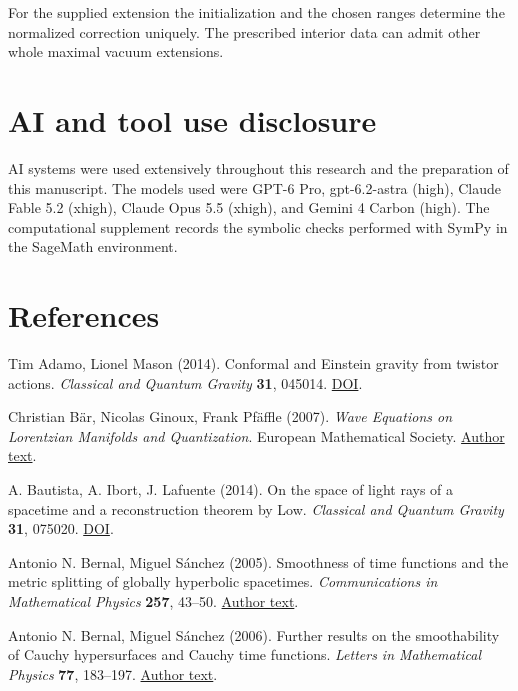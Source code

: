 \documentclass[
  english,
  11pt,
  reqno]{amsart}
\begin{document}
For the supplied extension the initialization and the chosen ranges
determine the normalized correction uniquely. The prescribed interior
data can admit other whole maximal vacuum extensions.

\section{AI and tool use disclosure}\label{ai-and-tool-use-disclosure}\label{sec:ai-and-tool-use-disclosure}

\begingroup{}\relax
AI systems were used extensively throughout this research and the
preparation of this manuscript. The models used were GPT-6 Pro,
gpt-6.2-astra (high), Claude Fable 5.2 (xhigh), Claude Opus 5.5 (xhigh),
and Gemini 4 Carbon (high). The computational supplement records the
symbolic checks performed with SymPy in the SageMath environment.\par\endgroup

\section{References}\label{references}\label{sec:online-coverage-references}

\leavevmode{}\label{ref-AdamoMason2014}Tim Adamo, Lionel Mason (2014). Conformal and Einstein gravity from
twistor actions. \emph{Classical and Quantum Gravity} \textbf{31},
045014. \href{https://doi.org/10.1088/0264-9381/31/4/045014}{DOI}.

\leavevmode{}\label{ref-BarGinouxPfaffle2007}Christian Bär, Nicolas Ginoux, Frank Pfäffle (2007). \emph{Wave
Equations on Lorentzian Manifolds and Quantization}. European
Mathematical Society. \href{https://arxiv.org/pdf/0806.1036}{Author
text}.

\leavevmode{}\label{ref-BautistaIbortLafuente2014}A. Bautista, A. Ibort, J. Lafuente (2014). On the space of light rays of
a spacetime and a reconstruction theorem by Low. \emph{Classical and
Quantum Gravity} \textbf{31}, 075020.
\href{https://doi.org/10.1088/0264-9381/31/7/075020}{DOI}.

\leavevmode{}\label{ref-BernalSanchez2005}Antonio N. Bernal, Miguel Sánchez (2005). Smoothness of time functions
and the metric splitting of globally hyperbolic spacetimes.
\emph{Communications in Mathematical Physics} \textbf{257}, 43--50.
\href{https://arxiv.org/pdf/gr-qc/0401112}{Author text}.

\leavevmode{}\label{ref-BernalSanchez2006}Antonio N. Bernal, Miguel Sánchez (2006). Further results on the
smoothability of Cauchy hypersurfaces and Cauchy time functions.
\emph{Letters in Mathematical Physics} \textbf{77}, 183--197.
\href{https://arxiv.org/pdf/gr-qc/0512095}{Author text}.
\end{document}
